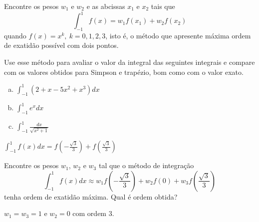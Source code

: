 \begin{exer} Encontre os pesos $w_1$ e $w_2$ e as abcissas $x_1$ e $x_2$ tais que
$$\int_{-1}^1f(x)=w_1f(x_1)+w_2f(x_2)$$
quando $f(x)=x^k, ~k=0,1,2,3$, isto é, o método que apresente máxima ordem de exatidão possível com dois pontos.

Use esse método para avaliar o valor da integral das seguintes integrais e compare com os valores obtidos para Simpson e trapézio, bom como com o valor exato.
\begin{enumerate}[a)]
\item $\displaystyle \int_{-1}^1\left(2+x-5x^2+x^3\right)dx$
\item $\displaystyle \int_{-1}^1e^{x}dx$
\item $\displaystyle \int_{-1}^1\frac{dx}{\sqrt{x^2+1}}$
\end{enumerate}
\end{exer}
\begin{resp}
  $\displaystyle \int_{-1}^1f(x)dx=f\left(-\frac{\sqrt{3}}{3}\right)+f\left(\frac{\sqrt{3}}{3}\right)$
\end{resp}


\begin{exer} Encontre os pesos $w_1$, $w_2$ e $w_3$ tal que o método de integração
$$\int_{-1}^1 f(x)dx \approx w_1 f\left(-\frac{\sqrt{3}}{3}\right)  + w_2f(0) + w_3f\left(\frac{\sqrt{3}}{3}\right)$$
tenha ordem de exatidão máxima. Qual é ordem obtida?
\end{exer}
\begin{resp}
  $w_1=w_3=1$ e $w_2=0$ com ordem 3.
\end{resp}


%
